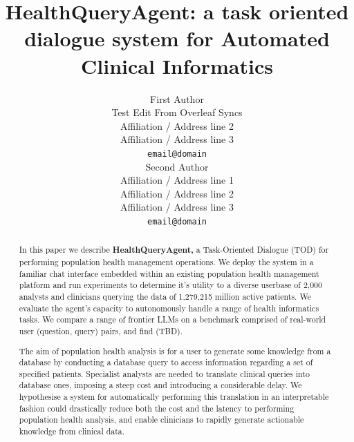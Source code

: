 \documentclass[11pt]{article}
\title{HealthQueryAgent: a task oriented dialogue system for Automated Clinical Informatics}
\author{First Author \\
  Test Edit From Overleaf Syncs \\
  Affiliation / Address line 2 \\
  Affiliation / Address line 3 \\
  \texttt{email@domain} \\\And
  Second Author \\
  Affiliation / Address line 1 \\
  Affiliation / Address line 2 \\
  Affiliation / Address line 3 \\
  \texttt{email@domain} \\}
\begin{document}
\maketitle
\begin{abstract}
In this paper we describe \textbf{HealthQueryAgent,} a Task-Oriented Dialogue (TOD) for performing population health management operations. We deploy the system in a familiar chat interface embedded within an existing population health management platform and run experiments to determine it's utility to a diverse userbase of 2,000 analysts and clinicians querying the data of 1,279,215 million active patients. We evaluate the agent's capacity to autonomously handle a range of health informatics tasks. We compare a range of frontier LLMs on a benchmark comprised of real-world user (question, query) pairs, and find (TBD). %

The aim of population health analysis is for a user to generate some knowledge from a database by conducting a database query to access information regarding a set of specified patients. 
Specialist analysts are needed to translate clinical queries into database ones, imposing a steep cost and introducing a considerable delay. We hypothesise a system for automatically performing this translation in an interpretable fashion could drastically reduce both the cost and the latency to performing population health analysis, and enable clinicians to rapidly generate actionable knowledge from clinical data.

\end{abstract}
\end{document}
